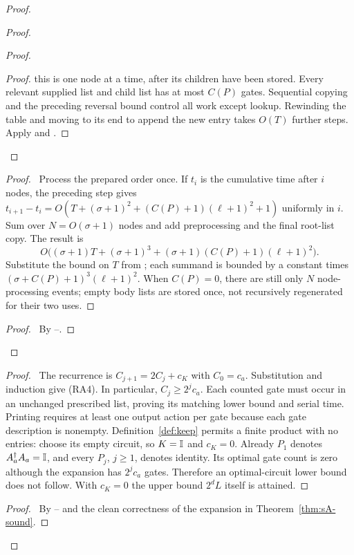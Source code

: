 \begin{proof}
\begin{proof}
\begin{proof}
\begin{proof}
   this is one node at a time, after its children have been stored.
   Every relevant supplied list and child list has at most $C(P)$
   gates. Sequential copying and the preceding reversal bound control
   all work except lookup. Rewinding the table and moving to its end
   to append the new entry takes $O(T)$ further steps. Apply
    and .
   \end{proof}
  \end{proof}
  \begin{proof}\pf\ Process the prepared order once. If $t_i$ is
  the cumulative time after $i$ nodes, the preceding step gives
  $t_{i+1}-t_i=O(T+(\sigma+1)^2+(C(P)+1)(\ell+1)^2+1)$ uniformly in $i$.
  Sum over $N=O(\sigma+1)$ nodes and add preprocessing and the final
  root-list copy. The result is
  \[
   O\bigl((\sigma+1)T+(\sigma+1)^3+
       (\sigma+1)(C(P)+1)(\ell+1)^2\bigr).
  \]
  Substitute the bound on $T$ from ;
  each summand is bounded by a constant times
  $(\sigma+C(P)+1)^3(\ell+1)^2$. When $C(P)=0$, there are still
  only $N$ node-processing events; empty body lists are stored once,
  not recursively regenerated for their two uses.\end{proof}
  \qedstep
  \begin{proof}\pf\ By --.
  \end{proof}
 \end{proof}
 \begin{proof}\pf\ The recurrence is $C_{j+1}=2C_j+c_K$ with
 $C_0=c_a$. Substitution and induction give (RA4). In particular,
 $C_j\geq2^jc_a$. Each counted gate must occur in an unchanged
 prescribed list, proving its matching lower bound and serial time.
 Printing requires at least one output action per gate because each
 gate description is nonempty. Definition~\ref{def:keep} permits a
 finite product with no entries: choose its empty circuit, so
 $K=\mathbb{I}$ and $c_K=0$. Already $P_1$ denotes
 $A_a^\dagger A_a=\mathbb{I}$, and every $P_j$, $j\geq1$, denotes
 identity. Its optimal gate count is zero although the expansion has
 $2^jc_a$ gates. Therefore an optimal-circuit lower bound does not
 follow. With $c_K=0$ the upper bound $2^dL$ itself is attained.
 \end{proof}
 \qedstep
 \begin{proof}\pf\ By --
 and the clean correctness of the expansion in
 Theorem~\ref{thm:sA-sound}.\end{proof}
\end{proof}

